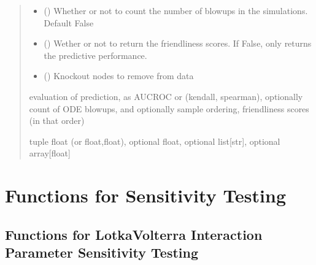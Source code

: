 \documentclass[letterpaper,10pt,english]{sphinxmanual}
\begin{document}
\begin{fulllineitems}
\begin{quote}
\begin{description}
\begin{itemize}
\item {} 
\sphinxAtStartPar
{} () \textendash{} Whether or not to count the number of blow\sphinxhyphen{}ups in the simulations. Default False

\item {} 
\sphinxAtStartPar
{} () \textendash{} Wether or not to return the friendliness scores. If False, only returns the predictive performance.

\item {} 
\sphinxAtStartPar
{} () \textendash{} Knockout nodes to remove from data

\end{itemize}

\sphinxAtStartPar
evaluation of prediction, as AUCROC or (kendall, spearman), optionally count of ODE blowups, and optionally sample ordering, friendliness scores (in that order)

\sphinxAtStartPar
tuple float (or float,float), optional float, optional list{[}str{]}, optional array{[}float{]}

\end{description}\end{quote}

\end{fulllineitems}


\sphinxstepscope


\chapter{Functions for Sensitivity Testing}
\label{\detokenize{sensit:functions-for-sensitivity-testing}}\label{\detokenize{sensit::doc}}

\section{Functions for Lotka\sphinxhyphen{}Volterra Interaction Parameter Sensitivity Testing}
\label{\detokenize{sensit:functions-for-lotka-volterra-interaction-parameter-sensitivity-testing}}
\end{document}
